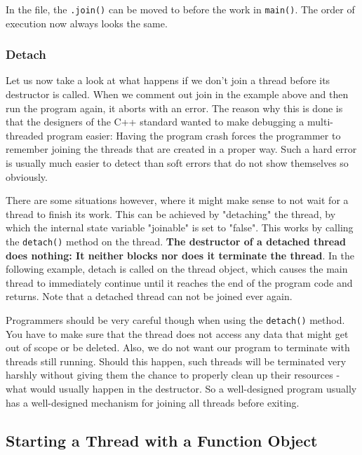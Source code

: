 \documentclass[11pt, a4paper]{article}
\begin{document}
In the file, the \texttt{.join()} can be moved to before the work in \texttt{main()}. The order of execution now always looks the same.


\subsubsection{Detach}%
\label{sub:detach}



Let us now take a look at what happens if we don’t join a thread before its destructor is called. When we comment out join in the example above and then run the program again, it aborts with an error. The reason why this is done is that the designers of the C++ standard wanted to make debugging a multi-threaded program easier: Having the program crash forces the programmer to remember joining the threads that are created in a proper way. Such a hard error is usually much easier to detect than soft errors that do not show themselves so obviously.

There are some situations however, where it might make sense to not wait for a thread to finish its work. This can be achieved by "detaching" the thread, by which the internal state variable "joinable" is set to "false". This works by calling the \texttt{detach()} method on the thread. \textbf{The destructor of a detached thread does nothing: It neither blocks nor does it terminate the thread}. In the following example, detach is called on the thread object, which causes the main thread to immediately continue until it reaches the end of the program code and returns. Note that a detached thread can not be joined ever again.


Programmers should be very careful though when using the \texttt{detach()} method. You have to make sure that the thread does not access any data that might get out of scope or be deleted. Also, we do not want our program to terminate with threads still running. Should this happen, such threads will be terminated very harshly without giving them the chance to properly clean up their resources - what would usually happen in the destructor. So a well-designed program usually has a well-designed mechanism for joining all threads before exiting.





\subsection{Starting a Thread with a Function Object}%
\label{sec:starting_a_thread_with_a_function_object}
\end{document}
